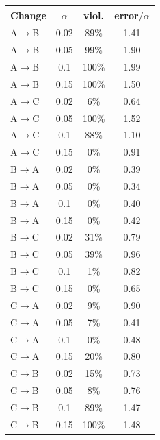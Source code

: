 \begin{tabular}{lccc}
\toprule
Change & $\alpha$ & viol. & error$/\alpha$ \\
\midrule
A$\to$B & 0.02 & 89\% & 1.41 \\
A$\to$B & 0.05 & 99\% & 1.90 \\
A$\to$B & 0.1 & 100\% & 1.99 \\
A$\to$B & 0.15 & 100\% & 1.50 \\
\addlinespace
A$\to$C & 0.02 & 6\% & 0.64 \\
A$\to$C & 0.05 & 100\% & 1.52 \\
A$\to$C & 0.1 & 88\% & 1.10 \\
A$\to$C & 0.15 & 0\% & 0.91 \\
\addlinespace
B$\to$A & 0.02 & 0\% & 0.39 \\
B$\to$A & 0.05 & 0\% & 0.34 \\
B$\to$A & 0.1 & 0\% & 0.40 \\
B$\to$A & 0.15 & 0\% & 0.42 \\
\addlinespace
B$\to$C & 0.02 & 31\% & 0.79 \\
B$\to$C & 0.05 & 39\% & 0.96 \\
B$\to$C & 0.1 & 1\% & 0.82 \\
B$\to$C & 0.15 & 0\% & 0.65 \\
\addlinespace
C$\to$A & 0.02 & 9\% & 0.90 \\
C$\to$A & 0.05 & 7\% & 0.41 \\
C$\to$A & 0.1 & 0\% & 0.48 \\
C$\to$A & 0.15 & 20\% & 0.80 \\
\addlinespace
C$\to$B & 0.02 & 15\% & 0.73 \\
C$\to$B & 0.05 & 8\% & 0.76 \\
C$\to$B & 0.1 & 89\% & 1.47 \\
C$\to$B & 0.15 & 100\% & 1.48 \\
\bottomrule
\end{tabular}

